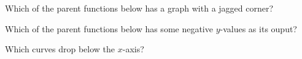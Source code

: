 \documentclass{ximera}
\begin{document}
\begin{question}
Which of the parent functions below has a graph with a jagged corner?
\begin{solution}
\begin{multiple-choice}
\end{multiple-choice}
\end{solution}
\end{question}

\begin{question}
Which of the parent functions below has some negative $y$-values as its ouput?
\begin{solution}
\begin{multiple-choice}
\end{multiple-choice}
\begin{hint}
Which curves drop below the $x$-axis?
\end{hint}
\end{solution}
\end{question}
\end{document}
